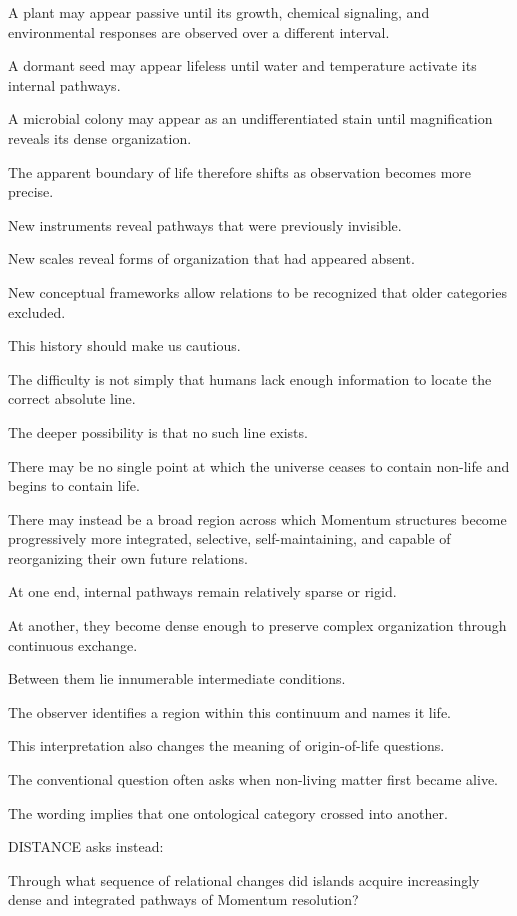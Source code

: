 A plant may appear passive until its growth, chemical signaling, and environmental responses are observed over a different interval.

A dormant seed may appear lifeless until water and temperature activate its internal pathways.

A microbial colony may appear as an undifferentiated stain until magnification reveals its dense organization.

The apparent boundary of life therefore shifts as observation becomes more precise.

New instruments reveal pathways that were previously invisible.

New scales reveal forms of organization that had appeared absent.

New conceptual frameworks allow relations to be recognized that older categories excluded.

This history should make us cautious.

The difficulty is not simply that humans lack enough information to locate the correct absolute line.

The deeper possibility is that no such line exists.

There may be no single point at which the universe ceases to contain non-life and begins to contain life.

There may instead be a broad region across which Momentum structures become progressively more integrated, selective, self-maintaining, and capable of reorganizing their own future relations.

At one end, internal pathways remain relatively sparse or rigid.

At another, they become dense enough to preserve complex organization through continuous exchange.

Between them lie innumerable intermediate conditions.

The observer identifies a region within this continuum and names it life.

This interpretation also changes the meaning of origin-of-life questions.

The conventional question often asks when non-living matter first became alive.

The wording implies that one ontological category crossed into another.

DISTANCE asks instead:

Through what sequence of relational changes did islands acquire increasingly dense and integrated pathways of Momentum resolution?


